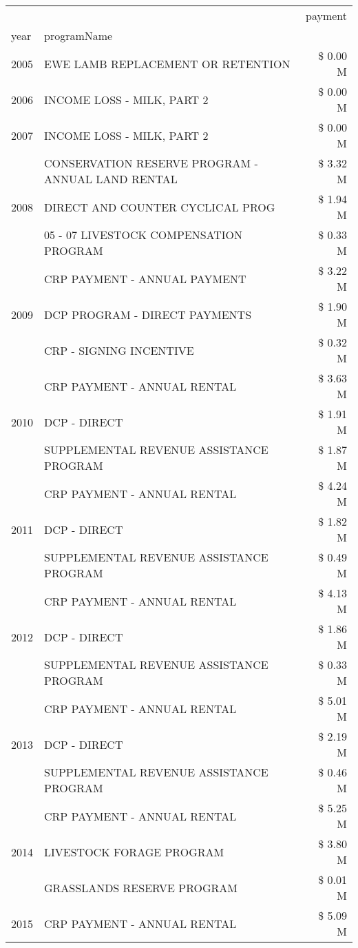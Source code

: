 \begin{tabular}{llr}
\toprule
 &  & payment \\
year & programName &  \\
\midrule
2005 & EWE LAMB REPLACEMENT OR RETENTION & \$ 0.00 M \\
\cline{1-3}
2006 & INCOME LOSS - MILK, PART 2 & \$ 0.00 M \\
\cline{1-3}
2007 & INCOME LOSS - MILK, PART 2 & \$ 0.00 M \\
\cline{1-3}
\multirow[t]{3}{*}{2008} & CONSERVATION RESERVE PROGRAM - ANNUAL LAND RENTAL & \$ 3.32 M \\
 & DIRECT AND COUNTER CYCLICAL PROG & \$ 1.94 M \\
 & 05 - 07 LIVESTOCK COMPENSATION PROGRAM & \$ 0.33 M \\
\cline{1-3}
\multirow[t]{3}{*}{2009} & CRP PAYMENT - ANNUAL PAYMENT & \$ 3.22 M \\
 & DCP PROGRAM - DIRECT PAYMENTS & \$ 1.90 M \\
 & CRP - SIGNING INCENTIVE & \$ 0.32 M \\
\cline{1-3}
\multirow[t]{3}{*}{2010} & CRP PAYMENT - ANNUAL RENTAL & \$ 3.63 M \\
 & DCP - DIRECT & \$ 1.91 M \\
 & SUPPLEMENTAL REVENUE ASSISTANCE PROGRAM & \$ 1.87 M \\
\cline{1-3}
\multirow[t]{3}{*}{2011} & CRP PAYMENT - ANNUAL RENTAL & \$ 4.24 M \\
 & DCP - DIRECT & \$ 1.82 M \\
 & SUPPLEMENTAL REVENUE ASSISTANCE PROGRAM & \$ 0.49 M \\
\cline{1-3}
\multirow[t]{3}{*}{2012} & CRP PAYMENT - ANNUAL RENTAL & \$ 4.13 M \\
 & DCP - DIRECT & \$ 1.86 M \\
 & SUPPLEMENTAL REVENUE ASSISTANCE PROGRAM & \$ 0.33 M \\
\cline{1-3}
\multirow[t]{3}{*}{2013} & CRP PAYMENT - ANNUAL RENTAL & \$ 5.01 M \\
 & DCP - DIRECT & \$ 2.19 M \\
 & SUPPLEMENTAL REVENUE ASSISTANCE PROGRAM & \$ 0.46 M \\
\cline{1-3}
\multirow[t]{3}{*}{2014} & CRP PAYMENT - ANNUAL RENTAL & \$ 5.25 M \\
 & LIVESTOCK FORAGE PROGRAM & \$ 3.80 M \\
 & GRASSLANDS RESERVE PROGRAM & \$ 0.01 M \\
\cline{1-3}
\multirow[t]{3}{*}{2015} & CRP PAYMENT - ANNUAL RENTAL & \$ 5.09 M \\

\end{tabular}
